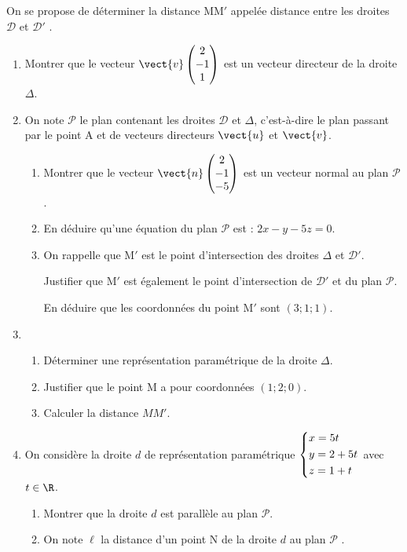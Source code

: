 On se propose de déterminer la distance MM$'$ appelée \og distance entre les droites $\mathcal{D}$ et $\mathcal{D}'$ \fg.
%
\begin{enumerate}[resume]
	\item Montrer que le vecteur $\vect{v}\begin{pmatrix}2\\- 1\\1\end{pmatrix}$ est un vecteur directeur de la droite $\Delta$.
	\item On note $\mathcal{P}$ le plan contenant les droites $\mathcal{D}$ et $\Delta$, c'est-à-dire le plan passant par le point A et de vecteurs directeurs $\vect{u}$ et $\vect{v}$.
	\begin{enumerate}
		\item Montrer que le vecteur $\vect{n}\begin{pmatrix}2\\-1\\-5 \end{pmatrix}$ est un vecteur normal au plan $\mathcal{P}$.
		\item En déduire qu'une équation du plan $\mathcal{P}$ est : $2x - y - 5z = 0$.
		\item On rappelle que M$'$ est le point d'intersection des droites $\Delta$ et $\mathcal{D}'$.
		
		Justifier que M$'$ est également le point d'intersection de $\mathcal{D}'$ et du plan $\mathcal{P}$.
		
		En déduire que les coordonnées du point M$'$ sont $(3;1;1)$.
	\end{enumerate}
	\item 
	\begin{enumerate}
		\item Déterminer une représentation paramétrique de la droite $\Delta$.
		\item Justifier que le point M a pour coordonnées $(1;2;0)$.
		\item Calculer la distance $MM'$.
	\end{enumerate}
	\item On considère la droite $d$ de représentation paramétrique $\begin{dcases}x = 5t\\y = 2 + 5t \\z = 1 + t \end{dcases}$ avec $t \in \R$.
	\begin{enumerate}
		\item Montrer que la droite $d$ est parallèle au plan $\mathcal{P}$.
		\item On note $\ell$ la distance d'un point N de la droite $d$ au plan $\mathcal{P}$ . 
		

\end{enumerate}
\end{enumerate}
